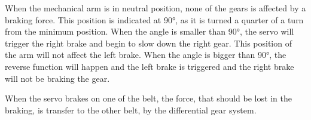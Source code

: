When the mechanical arm is in neutral position, none of the gears is affected by a braking force. This position is indicated at 90°, as it is turned a quarter of a turn from the minimum position. When the angle is smaller than 90°, the servo will trigger the right brake and begin to slow down the right gear. This position of the arm will not affect the left brake. When the angle is bigger than 90°, the reverse function will happen and the left brake is triggered and the right brake will not be braking the gear.

When the servo brakes on one of the belt, the force, that should be lost in the braking, is transfer to the other belt, by the differential gear system.